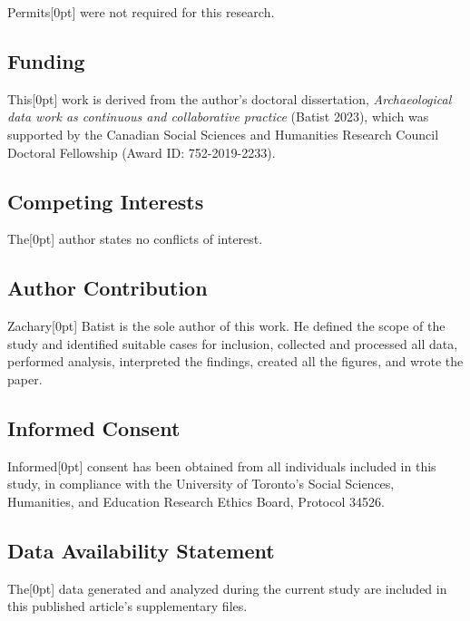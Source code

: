\documentclass[
]{article}
\newcommand{\paragraphnumber}[1]{\marginnote{\color{lightgray}\tiny{#1}}[0pt]}
\begin{document}
Permits\paragraphnumber{[73]} were not required for this research.

\subsection{Funding}\label{funding}

This\paragraphnumber{[74]} work is derived from the author's doctoral
dissertation, \emph{Archaeological data work as continuous and
collaborative practice} (Batist 2023), which was supported by the
Canadian Social Sciences and Humanities Research Council Doctoral
Fellowship (Award ID: 752-2019-2233).

\subsection{Competing Interests}\label{competing-interests}

The\paragraphnumber{[75]} author states no conflicts of interest.

\subsection{Author Contribution}\label{author-contribution}

Zachary\paragraphnumber{[76]} Batist is the sole author of this work. He
defined the scope of the study and identified suitable cases for
inclusion, collected and processed all data, performed analysis,
interpreted the findings, created all the figures, and wrote the paper.

\subsection{Informed Consent}\label{informed-consent}

Informed\paragraphnumber{[77]} consent has been obtained from all
individuals included in this study, in compliance with the University of
Toronto's Social Sciences, Humanities, and Education Research Ethics
Board, Protocol 34526.

\subsection{Data Availability
Statement}\label{data-availability-statement}

The\paragraphnumber{[78]} data generated and analyzed during the current
study are included in this published article's supplementary files.
\end{document}
